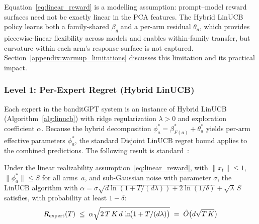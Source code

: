 \begin{remark}
\label{remark:linear_assumption}
Equation~\eqref{eq:linear_reward} is a modelling assumption: prompt--model
reward surfaces need not be exactly linear in the PCA features.  The Hybrid
LinUCB policy learns both a family-shared $\beta_g$ and a per-arm residual
$\theta_a$, which provides piecewise-linear flexibility across models and
enables within-family transfer, but curvature within each arm's response
surface is not captured.  Section~\ref{appendix:warmup_limitations} discusses
this limitation and its practical impact.
\end{remark}

\subsubsection{Level 1: Per-Expert Regret (Hybrid LinUCB)}

Each expert in the banditGPT system is an instance of Hybrid LinUCB
(Algorithm~\ref{alg:linucb}) with ridge regularization $\lambda > 0$ and
exploration coefficient $\alpha$.  Because the hybrid decomposition
$\phi_a^* = \beta_{F(a)}^* + \theta_a^*$ yields per-arm effective parameters
$\phi_a^*$, the standard Disjoint LinUCB regret bound applies to the combined
predictions.  The following result is
standard~\cite{li2010contextual, abbasi2011improved}:

\begin{theorem}
\label{thm:linucb_regret}
Under the linear realizability assumption~\eqref{eq:linear_reward}, with
$\|x_t\| \leq 1$, $\|\phi_a^*\| \leq S$ for all arms~$a$, and sub-Gaussian
noise with parameter $\sigma$, the LinUCB algorithm with
$\alpha = \sigma\sqrt{d \ln(1 + T/(d\lambda)) + 2\ln(1/\delta)} + \sqrt{\lambda}\,S$
satisfies, with probability at least $1 - \delta$:
\begin{equation}
R_{\textnormal{expert}}(T)
\;\leq\;
\alpha \sqrt{2\,T\,K\,d\,\ln\!\bigl(1 + T/(d\lambda)\bigr)}
\;=\; \tilde{O}\bigl(d\sqrt{T\,K}\bigr)
\label{eq:linucb_bound}
\end{equation}
\end{theorem}

